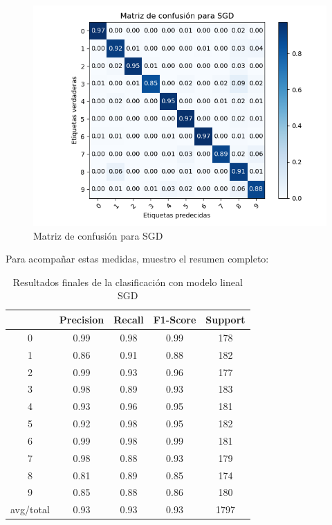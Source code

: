 \begin{figure}[H] %
	\centering
	\includegraphics[scale=0.8]{conf-m-sgd.png}  %
	\caption{Matriz de confusión para SGD} 
	\label{fig:conf-m-sgd}
\end{figure}

Para acompañar estas medidas, muestro el resumen completo:

\begin{table}[H]
	\centering
	\begin{tabular}{|c|c|c|c|c|}
		\hline
		& Precision & Recall & F1-Score & Support \\ \hline
		0         & 0.99      & 0.98   & 0.99     & 178     \\ \hline
		1         & 0.86      & 0.91   & 0.88     & 182     \\ \hline
		2         & 0.99      & 0.93   & 0.96     & 177     \\ \hline
		3         & 0.98      & 0.89   & 0.93     & 183     \\ \hline
		4         & 0.93      & 0.96   & 0.95     & 181     \\ \hline
		5         & 0.92      & 0.98   & 0.95     & 182     \\ \hline
		6         & 0.99      & 0.98   & 0.99     & 181     \\ \hline
		7         & 0.98      & 0.88   & 0.93     & 179     \\ \hline
		8         & 0.81      & 0.89   & 0.85     & 174     \\ \hline
		9         & 0.85      & 0.88   & 0.86     & 180     \\ \hline
		avg/total & 0.93      & 0.93   & 0.93     & 1797    \\ \hline
	\end{tabular}
	\caption{Resultados finales de la clasificación con modelo lineal SGD}
\end{table}



